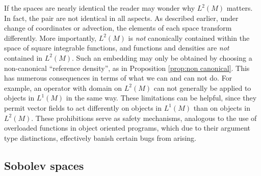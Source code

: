 \documentclass[final,leqno]{siamltex1213}
\begin{document}
If the spaces are nearly identical the reader may wonder why $L^2(M)$ matters.
In fact, the pair are not identical in all aspects.
As described earlier, under change of coordinates or advection, the elements of each space transform differently.
More importantly, $L^{2}(M)$ is \emph{not} canonically contained within the space of square integrable functions, and functions and densities are \emph{not} contained in $L^{2}(M)$.
Such an embedding may only be obtained by choosing a non-canonical ``reference density'', as in Proposition \ref{prop:non canonical}.
This has numerous consequences in terms of what we can and can not do.
For example, an operator with domain on $L^{2}(M)$ can not generally be applied to objects in $L^{1}(M)$ in the same way.
These limitations can be helpful, since they permit vector fields to act differently on objects in $L^{1}(M)$ than on objects in $L^{2}(M)$.
These prohibitions serve as safety mechanisms, analogous to the use of overloaded functions in object oriented programs, which due to their argument type distinctions, effectively banish certain bugs from arising.


\subsection{Sobolev spaces}
\label{sec:Sobolev spaces}
\end{document}
